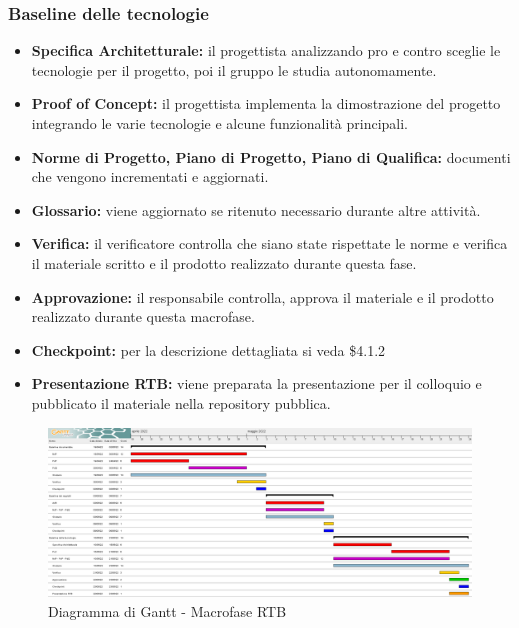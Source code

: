 \subsubsection{Baseline delle tecnologie}
\begin{itemize}
    \item \textbf{Specifica Architetturale:} il progettista analizzando pro e contro sceglie le tecnologie per il progetto, poi il gruppo le studia autonomamente.
    \item \textbf{Proof of Concept:} il progettista implementa la dimostrazione del progetto integrando le varie tecnologie e alcune funzionalità principali.
    \item \textbf{Norme di Progetto, Piano di Progetto, Piano di Qualifica:} documenti che vengono incrementati e aggiornati.
    \item \textbf{Glossario:} viene aggiornato se ritenuto necessario durante altre attività.
    \item \textbf{Verifica:} il verificatore controlla che siano state rispettate le norme e verifica il materiale scritto e il prodotto realizzato durante questa fase.
    \item \textbf{Approvazione:} il responsabile controlla, approva il materiale e il prodotto realizzato durante questa macrofase.
    \item \textbf{Checkpoint:} per la descrizione dettagliata si veda \$4.1.2
    \item \textbf{Presentazione RTB:} viene preparata la presentazione per il colloquio e pubblicato il materiale nella repository pubblica.
\end{itemize}


\begin{landscape}
	\begin{figure}
	\includegraphics[width=\linewidth]{images/RTB-Gantt.png}
    \caption{Diagramma di Gantt - Macrofase RTB}
	\end{figure}
\end{landscape}
